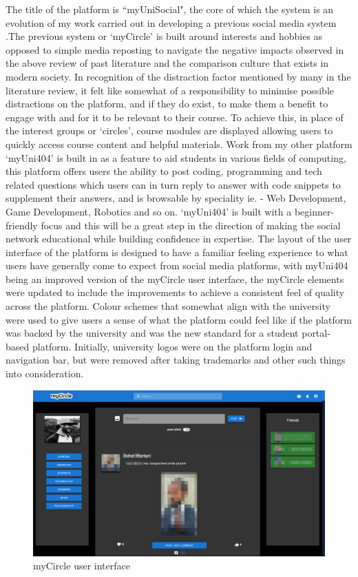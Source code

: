 \documentclass[lettersize,journal]{IEEEtran}
\begin{document}
        The title of the platform is ``myUniSocial", the core of which the system is an evolution of my work carried out in developing a previous
        social media system \cite{Daley 2022}.The previous system or `myCircle'\cite{myCircle} is built around interests and hobbies as opposed
        to simple media reposting to navigate the negative impacts observed in the above review of past literature and the comparison culture that exists in modern
        society. In recognition of the distraction factor mentioned by many in the literature review, it felt like somewhat of a responsibility
        to minimise possible distractions on the platform, and if they do exist, to make them a benefit to engage with and for it to be relevant
        to their course. To achieve this, in place of the interest groups or `circles', course modules are displayed allowing users to
        quickly access course content and helpful materials. Work from my other  platform `myUni404' \cite{myUni404} is built in as a feature to aid students
        in various fields of computing, this platform offers users the ability to post coding, programming and tech related questions which users can in turn reply to answer with code snippets to
	supplement their answers, and is browsable by speciality ie. -  Web Development, Game Development, Robotics and so on. `myUni404' is built with a beginner-friendly focus and this will be
	a great step in the direction of making the social network educational while building confidence in expertise.
	The layout of the user interface of the platform is designed to have a familiar feeling experience to what users have generally come to expect from social media platforms, with myUni404 being an 
	improved version of the myCircle user interface, the myCircle elements were updated to include the improvements to achieve a consistent feel of quality across the platform. 
	Colour schemes that somewhat align with the university were used to give users a sense of what the platform could feel like if the platform was backed by the university and was the new
	standard for a student portal-based platform. Initially, university logos were on the platform login and navigation bar, but were removed after taking trademarks and other such things into
	consideration.

        \begin{figure}[h!]
                \includegraphics[width=\linewidth]{myCircle.PNG}
                \caption{myCircle user interface}
                \label{figure 1}
        \end{figure}
	
\end{document}
